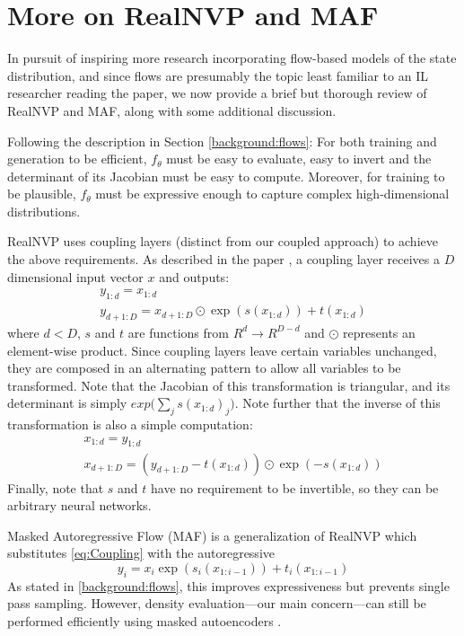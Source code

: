 \section{More on RealNVP and MAF}\label{appendix:flows}
In pursuit of inspiring more research incorporating flow-based models of the state distribution, 
and since flows are presumably the topic least familiar to an IL researcher reading the paper, we now provide a brief but thorough review of RealNVP and MAF, along with some additional discussion.

Following the description in Section \ref{background:flows}: For both training and generation to be efficient, $f_{\theta}$ must be easy to evaluate, easy to invert and the determinant of its Jacobian must be easy to compute. Moreover, for training to be plausible, $f_{\theta}$ must be expressive enough to capture complex high-dimensional distributions. 

RealNVP \cite{dinh2016density} uses coupling layers (distinct from our coupled approach) to achieve the above requirements. As described in the paper \cite{dinh2016density}, a coupling layer receives a $D$ dimensional input vector $x$ and outputs: 
\begin{gather}\label{eq:Coupling} 
 y_{1:d} = x_{1:d} \\
 y_{d+1:D} = x_{d+1:D} \odot \exp(s(x_{1:d})) + t(x_{1:d}) \nonumber
\end{gather}
where $d<D$, $s$ and $t$ are functions from $R^d \to R^{D-d}$ and $\odot$ represents an element-wise product. Since coupling layers leave certain variables unchanged, they are composed in an alternating pattern to allow all variables to be transformed. Note that the Jacobian of this transformation is triangular, and its determinant is simply $exp(\sum_j{s(x_{1:d})_j)}$. Note further that the inverse of this transformation is also a simple computation: 
\begin{gather}
 x_{1:d} = y_{1:d} \\
 x_{d+1:D} = (y_{d+1:D} - t(x_{1:d})) \odot \exp( - s(x_{1:d})) \nonumber
\end{gather}
Finally, note that $s$ and $t$ have no requirement to be invertible, so they can be arbitrary neural networks. 

Masked Autoregressive Flow (MAF) \cite{papamakarios2017masked} is a generalization of RealNVP which substitutes \eqref{eq:Coupling} with the autoregressive
\begin{equation}
    y_{i} = x_{i} \exp(s_i(x_{1:i-1})) + t_i(x_{1:i-1})
\end{equation}
As stated in \ref{background:flows}, this improves expressiveness but prevents single pass sampling. However, density evaluation—our main concern—can still be performed efficiently using masked autoencoders \cite{germain2015made}.


